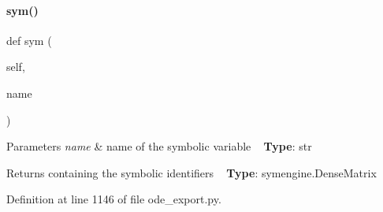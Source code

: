 \paragraph{\texorpdfstring{sym()}{sym()}}
{\footnotesize\ttfamily def sym (\begin{DoxyParamCaption}\item[{}]{self,  }\item[{}]{name }\end{DoxyParamCaption})}


\begin{DoxyParams}{Parameters}
{\em name} & name of the symbolic variable ~\newline
{\bfseries{Type}}\+: str\\
\hline
\end{DoxyParams}
\begin{DoxyReturn}{Returns}
containing the symbolic identifiers ~\newline
{\bfseries{Type}}\+: symengine.\+Dense\+Matrix 
\end{DoxyReturn}


Definition at line 1146 of file ode\+\_\+export.\+py.

